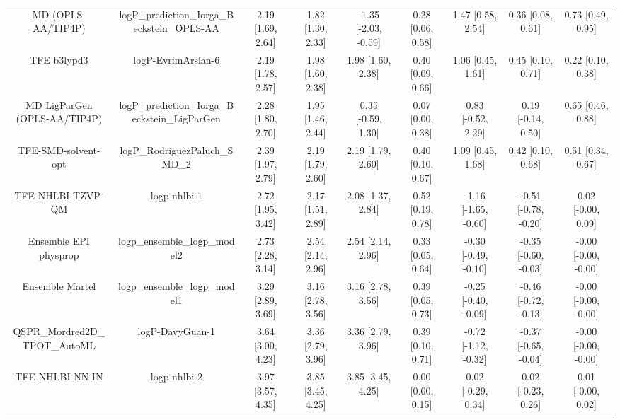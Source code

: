 \documentclass{article}
\begin{document}
\begin{center}
\begin{longtable}{|ccccccccc|}
           MD (OPLS-AA/TIP4P) &    logP\_prediction\_Iorga\_Beckstein\_OPLS-AA &  2.19 [1.69, 2.64] &  1.82 [1.30, 2.33] &  -1.35 [-2.03, -0.59] &  0.28 [0.06, 0.58] &     1.47 [0.58, 2.54] &     0.36 [0.08, 0.61] &     0.73 [0.49, 0.95] \\
                  TFE b3lypd3 &                             logP-EvrimArslan-6 &  2.19 [1.78, 2.57] &  1.98 [1.60, 2.38] &     1.98 [1.60, 2.38] &  0.40 [0.09, 0.66] &     1.06 [0.45, 1.61] &     0.45 [0.10, 0.71] &     0.22 [0.10, 0.38] \\
 MD LigParGen (OPLS-AA/TIP4P) &  logP\_prediction\_Iorga\_Beckstein\_LigParGen &  2.28 [1.80, 2.70] &  1.95 [1.46, 2.44] &    0.35 [-0.59, 1.30] &  0.07 [0.00, 0.38] &    0.83 [-0.52, 2.29] &    0.19 [-0.14, 0.50] &     0.65 [0.46, 0.88] \\
          TFE-SMD-solvent-opt &                  logP\_RodriguezPaluch\_SMD\_2 &  2.39 [1.97, 2.79] &  2.19 [1.79, 2.60] &     2.19 [1.79, 2.60] &  0.40 [0.10, 0.67] &     1.09 [0.45, 1.68] &     0.42 [0.10, 0.68] &     0.51 [0.34, 0.67] \\
            TFE-NHLBI-TZVP-QM &                                   logp-nhlbi-1 &  2.72 [1.95, 3.42] &  2.17 [1.51, 2.89] &     2.08 [1.37, 2.84] &  0.52 [0.19, 0.78] &  -1.16 [-1.65, -0.60] &  -0.51 [-0.78, -0.20] &    0.02 [-0.00, 0.09] \\
        Ensemble EPI physprop &                   logp\_ensemble\_logp\_model2 &  2.73 [2.28, 3.14] &  2.54 [2.14, 2.96] &     2.54 [2.14, 2.96] &  0.33 [0.05, 0.64] &  -0.30 [-0.49, -0.10] &  -0.35 [-0.60, -0.03] &  -0.00 [-0.00, -0.00] \\
              Ensemble Martel &                   logp\_ensemble\_logp\_model1 &  3.29 [2.89, 3.69] &  3.16 [2.78, 3.56] &     3.16 [2.78, 3.56] &  0.39 [0.05, 0.73] &  -0.25 [-0.40, -0.09] &  -0.46 [-0.72, -0.13] &  -0.00 [-0.00, -0.00] \\
   QSPR_Mordred2D_TPOT_AutoML &                                logP-DavyGuan-1 &  3.64 [3.00, 4.23] &  3.36 [2.79, 3.96] &     3.36 [2.79, 3.96] &  0.39 [0.10, 0.71] &  -0.72 [-1.12, -0.32] &  -0.37 [-0.65, -0.04] &  -0.00 [-0.00, -0.00] \\
              TFE-NHLBI-NN-IN &                                   logp-nhlbi-2 &  3.97 [3.57, 4.35] &  3.85 [3.45, 4.25] &     3.85 [3.45, 4.25] &  0.00 [0.00, 0.15] &    0.02 [-0.29, 0.34] &    0.02 [-0.23, 0.26] &    0.01 [-0.00, 0.02] \\
\end{longtable}
\end{center}
\end{document}
